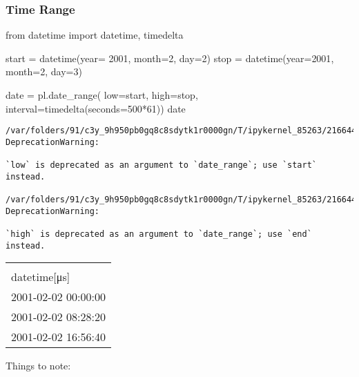 \documentclass[
  letterpaper,
  DIV=11,
  numbers=noendperiod]{scrartcl}
\newenvironment{Shaded}{\begin{snugshade}}{\end{snugshade}}
\newcommand{\DecValTok}[1]{\textcolor[rgb]{0.68,0.00,0.00}{#1}}
\newcommand{\ImportTok}[1]{\textcolor[rgb]{0.00,0.46,0.62}{#1}}
\newcommand{\NormalTok}[1]{\textcolor[rgb]{0.00,0.23,0.31}{#1}}
\newcommand{\OperatorTok}[1]{\textcolor[rgb]{0.37,0.37,0.37}{#1}}
\begin{document}
\hypertarget{time-range}{%
\subsubsection{Time Range}\label{time-range}}

\begin{Shaded}
\begin{Highlighting}[]
\ImportTok{from}\NormalTok{ datetime }\ImportTok{import}\NormalTok{ datetime, timedelta}

\NormalTok{start }\OperatorTok{=}\NormalTok{ datetime(year}\OperatorTok{=} \DecValTok{2001}\NormalTok{, month}\OperatorTok{=}\DecValTok{2}\NormalTok{, day}\OperatorTok{=}\DecValTok{2}\NormalTok{)}
\NormalTok{stop }\OperatorTok{=}\NormalTok{ datetime(year}\OperatorTok{=}\DecValTok{2001}\NormalTok{, month}\OperatorTok{=}\DecValTok{2}\NormalTok{, day}\OperatorTok{=}\DecValTok{3}\NormalTok{)}

\NormalTok{date }\OperatorTok{=}\NormalTok{ pl.date\_range(}
\NormalTok{  low}\OperatorTok{=}\NormalTok{start, }
\NormalTok{  high}\OperatorTok{=}\NormalTok{stop, }
\NormalTok{  interval}\OperatorTok{=}\NormalTok{timedelta(seconds}\OperatorTok{=}\DecValTok{500}\OperatorTok{*}\DecValTok{61}\NormalTok{))}
\NormalTok{date}
\end{Highlighting}
\end{Shaded}

\begin{verbatim}
/var/folders/91/c3y_9h950pb0gq8c8sdytk1r0000gn/T/ipykernel_85263/2166444983.py:6: DeprecationWarning:

`low` is deprecated as an argument to `date_range`; use `start` instead.

/var/folders/91/c3y_9h950pb0gq8c8sdytk1r0000gn/T/ipykernel_85263/2166444983.py:6: DeprecationWarning:

`high` is deprecated as an argument to `date_range`; use `end` instead.
\end{verbatim}

\begin{longtable}[]{@{}l@{}}
\toprule()
 \\
datetime{[}μs{]} \\
\midrule()
\endhead
2001-02-02 00:00:00 \\
2001-02-02 08:28:20 \\
2001-02-02 16:56:40 \\
\bottomrule()
\end{longtable}

Things to note:
\end{document}
